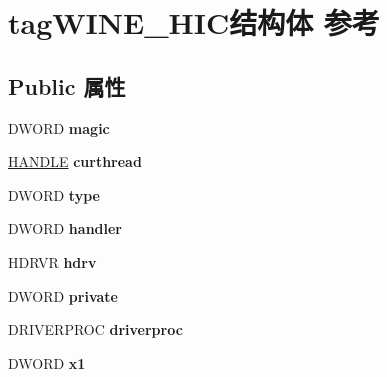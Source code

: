 \hypertarget{structtag_w_i_n_e___h_i_c}{}\section{tag\+W\+I\+N\+E\+\_\+\+H\+I\+C结构体 参考}
\label{structtag_w_i_n_e___h_i_c}
\subsection*{Public 属性}
\begin{DoxyCompactItemize}
\item 
\mbox{\label{structtag_w_i_n_e___h_i_c_a8ceab87aa855301009a9244d2361a93a}} 
D\+W\+O\+RD {\bfseries magic}
\item 
\mbox{\label{structtag_w_i_n_e___h_i_c_a2cf5bcf2f1123eb045d07c95ee275f10}} 
\hyperlink{interfacevoid}{H\+A\+N\+D\+LE} {\bfseries curthread}
\item 
\mbox{\label{structtag_w_i_n_e___h_i_c_abfd76f1578a366e5e761618cf684bef5}} 
D\+W\+O\+RD {\bfseries type}
\item 
\mbox{\label{structtag_w_i_n_e___h_i_c_a3c846d0a7d7f9369a160b6833f338c37}} 
D\+W\+O\+RD {\bfseries handler}
\item 
\mbox{\label{structtag_w_i_n_e___h_i_c_a9cc3aff3e61cbaf1e7b59d6cfa8fdce3}} 
H\+D\+R\+VR {\bfseries hdrv}
\item 
\mbox{\label{structtag_w_i_n_e___h_i_c_a3eb71669c697ecd26359a49c5485b2ac}} 
D\+W\+O\+RD {\bfseries private}
\item 
\mbox{\label{structtag_w_i_n_e___h_i_c_af0eb529fefcd24a0fdc98c673e648e72}} 
D\+R\+I\+V\+E\+R\+P\+R\+OC {\bfseries driverproc}
\item 
\mbox{\label{structtag_w_i_n_e___h_i_c_aff278ef28cd02213523064569bfb2b9b}} 
D\+W\+O\+RD {\bfseries x1}
\item 
\mbox{\label{structtag_w_i_n_e___h_i_c_a047e1410ac66d23fe90cfa14a4ec5f9c}} 

\end{DoxyCompactItemize}

